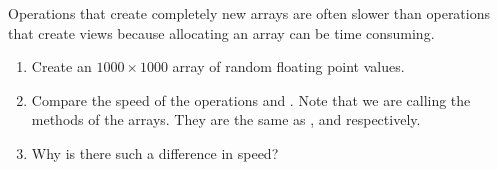 \begin{problem} 
Operations that create completely new arrays are often slower than 
operations that create views because allocating an array can be time 
consuming. 
\begin{enumerate}
\item Create an $1000 \times 1000$ array  of random floating point values. 
\item Compare the speed of the operations 
and . Note that we are calling the methods of the arrays. 
They are the same as , and 
respectively. 
\item Why is there such a difference in speed? 
\end{enumerate}
\end{problem}

